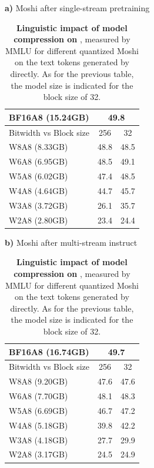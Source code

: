 \begin{table}[tbh]
    \caption{\label{tab:quantmoshi}\textbf{Linguistic impact of model compression on \ours}, measured by MMLU for different quantized Moshi on the text tokens generated by \interleaving{} directly. As for the previous table, the model size is indicated for the block size of 32.}
    
    \centering
    \begin{minipage}[t]{0.47\textwidth}
    \centering
    \textbf{a)} Moshi after single-stream pretraining
    \smallskip 

    \begin{tabular}{lcc}
    \toprule
       BF16A8 (15.24GB)& \multicolumn{2}{c}{49.8} \\
       \midrule
        Bitwidth vs Block size & 256 & 32 \\
        \midrule
         W8A8 (8.33GB) & 48.8 & 48.5\\
         W6A8 (6.95GB)& 48.5 & 49.1 \\
         W5A8 (6.02GB) & 47.4 & 48.5 \\
         W4A8 (4.64GB) & 44.7  & 45.7 \\
         W3A8 (3.72GB) & 26.1 & 35.7 \\
         W2A8 (2.80GB) & 23.4&  24.4\\
        \bottomrule
    \end{tabular}
    \end{minipage}
    \hfill 
        \begin{minipage}[t]{0.47\textwidth}
    \centering
    \textbf{b)} Moshi after multi-stream instruct
    \smallskip
    
    \begin{tabular}{lcc}
        \toprule
       BF16A8 (16.74GB) & \multicolumn{2}{c}{49.7}  \\
        \midrule
        Bitwidth vs Block size & 256 & 32 \\
        \midrule
         W8A8 (9.20GB) & 47.6 & 47.6 \\
         W6A8  (7.70GB)& 48.1 & 48.3 \\
         W5A8 (6.69GB) & 46.7 & 47.2 \\
         W4A8 (5.18GB) & 39.8  & 42.2 \\
         W3A8 (4.18GB) & 27.7 & 29.9 \\
         W2A8 (3.17GB) & 24.5& 24.9 \\
        \bottomrule
    \end{tabular}
    \end{minipage}


    
    \end{table}
